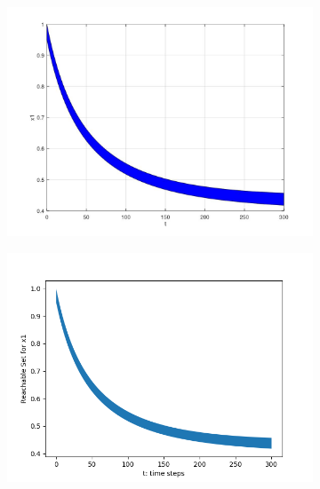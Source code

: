 \documentclass[EPiC]{easychair}
\begin{document}
\begin{figure}[h]

    \begin{subfigure}{0.5\textwidth}
    \centering
    \includegraphics[width=\textwidth]{SapoFigures/LV/SapoLV_X1.jpg}
    \end{subfigure}
    \begin{subfigure}{0.6\textwidth}
    \centering
    \includegraphics[width=\textwidth]{SapoFigures/LV/KaaLV_X1.png}
    \end{subfigure}
    

\end{figure}
\end{document}
